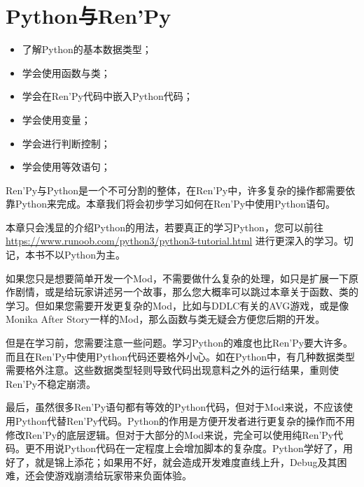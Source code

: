 \documentclass[../../Main.tex]{subfiles}
\begin{document}
\chapter{Python与Ren'Py}
\begin{ChapterGoals}
    \begin{itemize}
        \item 了解Python的基本数据类型；
        \item 学会使用函数与类；
        \item 学会在Ren'Py代码中嵌入Python代码；
        \item 学会使用变量；
        \item 学会进行判断控制；
        \item 学会使用等效语句；
    \end{itemize}
\end{ChapterGoals}

Ren'Py与Python是一个不可分割的整体，在Ren'Py中，许多复杂的操作都需要依靠Python来完成。本章我们将会初步学习如何在Ren'Py中使用Python语句。

\begin{Attention}
    本章只会浅显的介绍Python的用法，若要真正的学习Python，您可以前往 \url{https://www.runoob.com/python3/python3-tutorial.html} 进行更深入的学习。切记，本书不以Python为主。
\end{Attention}

\begin{Warning}
    如果您只是想要简单开发一个Mod，不需要做什么复杂的处理，如只是扩展一下原作剧情，或是给玩家讲述另一个故事，那么您大概率可以跳过本章关于函数、类的学习。但如果您需要开发更复杂的Mod，比如与DDLC有关的AVG游戏，或是像Monika After Story一样的Mod，那么函数与类无疑会方便您后期的开发。

    但是在学习前，您需要注意一些问题。学习Python的难度也比Ren'Py要大许多。而且在Ren'Py中使用Python代码还要格外小心。如在Python中，有几种数据类型需要格外注意。这些数据类型轻则导致代码出现意料之外的运行结果，重则使Ren'Py不稳定崩溃。

    最后，虽然很多Ren'Py语句都有等效的Python代码，但对于Mod来说，不应该使用Python代替Ren'Py代码。Python的作用是方便开发者进行更复杂的操作而不用修改Ren'Py的底层逻辑。但对于大部分的Mod来说，完全可以使用纯Ren'Py代码。更不用说Python代码在一定程度上会增加脚本的复杂度。Python学好了，用好了，就是锦上添花；如果用不好，就会造成开发难度直线上升，Debug及其困难，还会使游戏崩溃给玩家带来负面体验。
\end{Warning}






\end{document}
